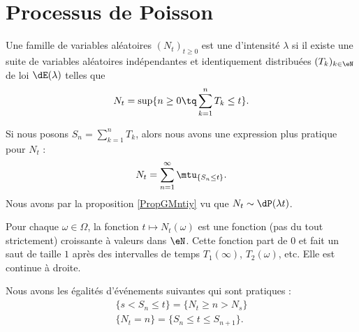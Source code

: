\section{Processus de Poisson}
\label{SecHxbtzQ}

\begin{definition}
    Une famille de variables aléatoires \( (N_t)_{t\geq 0}\) est une  d'intensité \( \lambda\) si il existe une suite de variables aléatoires indépendantes et identiquement distribuées \( (T_k)_{k\in \eN}\) de loi \( \dE(\lambda)\) telles que 
    \begin{equation}
        N_t=\sup\{ n\geq 0\tq \sum_{k=1}^nT_k\leq t \}.
    \end{equation}
\end{definition}
Si nous posons \( S_n=\sum_{k=1}^nT_k\), alors nous avons une expression plus pratique pour \( N_t\) :
\begin{equation}
    N_t=\sum_{n=1}^{\infty}\mtu_{\{ S_n\leq t \}}.
\end{equation}
Nous avons par la proposition \ref{PropGMntiy} vu que \( N_t\sim\dP(\lambda t)\).


Pour chaque \( \omega\in \Omega\), la fonction \( t\mapsto N_t(\omega)\) est une fonction (pas du tout strictement) croissante à valeurs dans $\eN$. Cette fonction part de \( 0\) et fait un saut de taille \( 1\) après des intervalles de temps \( T_1(\infty)\), \( T_2(\omega)\), etc. Elle est continue à droite.

Nous avons les égalités d'événements suivantes qui sont pratiques :
\begin{subequations}
    \begin{align}
        \{ s<S_n\leq t \}=\{ N_t\geq n>N_s \}\\
        \{ N_t=n \}=\{ S_n\leq t\leq S_{n+1} \}.
    \end{align}
\end{subequations}

